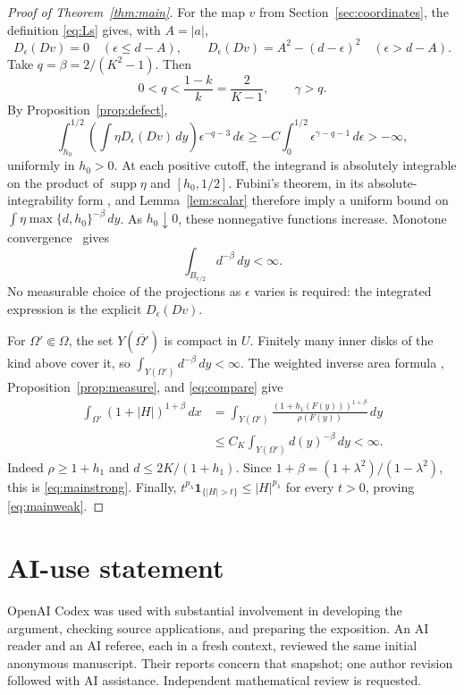 \documentclass[11pt]{article}
\theoremstyle{remark}
\numberwithin{equation}{section}
\newcommand{\supp}{\operatorname{supp}}
\begin{document}
\begin{proof}[Proof of Theorem~\ref{thm:main}]
For the map \(v\) from Section~\ref{sec:coordinates}, the definition
\eqref{eq:Ls} gives, with \(A=|a|\),
\[
D_\epsilon(Dv)=0\quad(\epsilon\le d-A),\qquad
D_\epsilon(Dv)=A^2-(d-\epsilon)^2\quad(\epsilon>d-A).
\]
Take \(q=\beta=2/(K^2-1)\). Then
\[
0<q<\frac{1-k}{k}=\frac2{K-1},\qquad \gamma>q.
\]
By Proposition~\ref{prop:defect},
\[
\int_{h_0}^{1/2}
\left(\int\eta D_\epsilon(Dv)\,dy\right)\epsilon^{-q-3}\,d\epsilon
\ge-C\int_0^{1/2}\epsilon^{\gamma-q-1}\,d\epsilon>- \infty,
\]
uniformly in \(h_0>0\).
At each positive cutoff, the integrand is absolutely integrable on the
product of \(\supp\eta\) and \([h_0,1/2]\).
Fubini's theorem, in its absolute-integrability form
\cite[Theorem~1.7.21 and Corollary~1.7.23]{Tao}, and
Lemma~\ref{lem:scalar} therefore imply a uniform bound on
\(\int\eta\max\{d,h_0\}^{-\beta}\,dy\).
As \(h_0\downarrow0\), these nonnegative functions increase.
Monotone convergence~\cite[Theorem~1.4.44]{Tao} gives
\begin{equation}\label{eq:moment}
\int_{B_{r/2}}d^{-\beta}\,dy<\infty.
\end{equation}
No measurable choice of the projections as \(\epsilon\) varies is required:
the integrated expression is the explicit \(D_\epsilon(Dv)\).

For \(\Omega'\Subset\Omega\), the set \(Y(\overline{\Omega'})\) is compact
in \(U\). Finitely many inner disks of the kind above cover it, so
\(\int_{Y(\Omega')}d^{-\beta}\,dy<\infty\).
The weighted inverse area formula
\cite[\S2, Theorem~2]{Jerrard}, Proposition~\ref{prop:measure},
and \eqref{eq:compare} give
\[
\begin{aligned}
\int_{\Omega'}(1+|H|)^{1+\beta}\,dx
&=\int_{Y(\Omega')}
\frac{(1+h_1(F(y)))^{1+\beta}}{\rho(F(y))}\,dy\\
&\le C_K\int_{Y(\Omega')}d(y)^{-\beta}\,dy<\infty.
\end{aligned}
\]
Indeed \(\rho\ge1+h_1\) and \(d\le2K/(1+h_1)\).
Since \(1+\beta=(1+\lambda^2)/(1-\lambda^2)\), this is
\eqref{eq:mainstrong}. Finally,
\(t^{p_\lambda}\mathbf1_{\{|H|>t\}}\le|H|^{p_\lambda}\)
for every \(t>0\), proving \eqref{eq:mainweak}.
\end{proof}

\section*{AI-use statement}
OpenAI Codex was used with substantial involvement in developing the argument,
checking source applications, and preparing the exposition.
An AI reader and an AI referee, each in a fresh context, reviewed the same
initial anonymous manuscript. Their reports concern that snapshot; one author
revision followed with AI assistance.
Independent mathematical review is requested.
\end{document}
